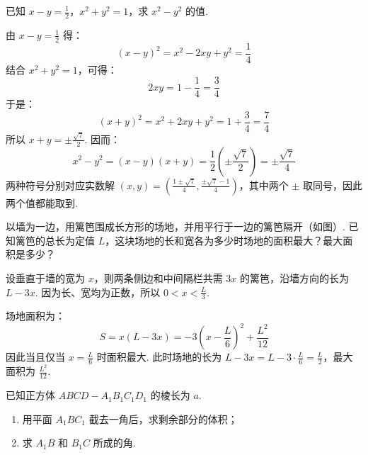 \documentclass[UTF8,a4paper,oneside,11pt]{ctexbook}
\begin{document}
\begin{problem}

已知 \(x-y=\frac{1}{2}\)，\(x^2+y^2=1\)，求 \(x^2-y^2\) 的值.
\end{problem}

\begin{solution}
由 \(x-y=\frac12\) 得：
\[
 (x-y)^2=x^2-2xy+y^2=\frac14
\]
结合 \(x^2+y^2=1\)，可得：
\[
 2xy=1-\frac14=\frac34
\]
于是：
\[
 (x+y)^2=x^2+2xy+y^2=1+\frac34=\frac74
\]
所以 \(x+y=\pm\frac{\sqrt7}{2}\). 因而：
\[
 x^2-y^2=(x-y)(x+y)=\frac12\left(\pm\frac{\sqrt7}{2}\right)=\pm\frac{\sqrt7}{4}
\]
两种符号分别对应实数解 \(\displaystyle (x,y)=\left(\frac{1\pm\sqrt7}{4},\frac{\pm\sqrt7-1}{4}\right)\)，其中两个 \(\pm\) 取同号，因此两个值都能取到.
\end{solution}

\begin{problem}

以墙为一边，用篱笆围成长方形的场地，并用平行于一边的篱笆隔开（如图）. 已知篱笆的总长为定值 \(L\)，这块场地的长和宽各为多少时场地的面积最大？最大面积是多少？

\end{problem}

\begin{solution}
设垂直于墙的宽为 \(x\)，则两条侧边和中间隔栏共需 \(3x\) 的篱笆，沿墙方向的长为 \(L-3x\). 因为长、宽均为正数，所以 \(0<x<\frac{L}{3}\).

场地面积为：
\[
 S=x(L-3x)=-3\left(x-\frac{L}{6}\right)^2+\frac{L^2}{12}
\]
因此当且仅当 \(x=\frac{L}{6}\) 时面积最大. 此时场地的长为 \(L-3x=L-3\cdot\frac{L}{6}=\frac{L}{2}\)，最大面积为 \(\frac{L^2}{12}\).
\end{solution}

\begin{problem}

已知正方体 \(ABCD-A_1B_1C_1D_1\) 的棱长为 \(a\).

\begin{enumerate}
\item 用平面 \(A_1BC_1\) 截去一角后，求剩余部分的体积；
\item 求 \(A_1B\) 和 \(B_1C\) 所成的角.
\end{enumerate}
\end{problem}
\end{document}
